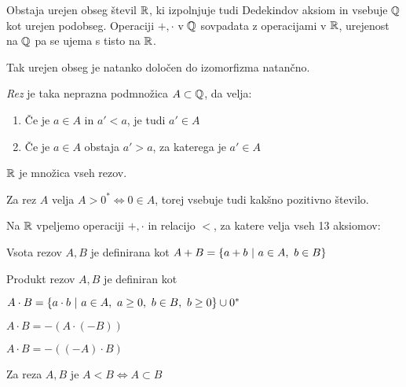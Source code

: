 \documentclass[12pt, a4paper]{article}
\begin{document}
\begin{izrek}
Obstaja urejen obseg števil $\mathbb{R}$, ki izpolnjuje tudi Dedekindov aksiom in vsebuje $\mathbb{Q}$ kot urejen podobseg. Operaciji $+,\cdot$ v $\mathbb{Q}$ sovpadata z operacijami v $\mathbb{R}$, urejenost na $\mathbb{Q}$ pa se ujema s tisto na $\mathbb{R}$.
\end{izrek}

\begin{opomba}
Tak urejen obseg je natanko določen do izomorfizma natančno.
\end{opomba}

\begin{definicija}
\emph{Rez} je taka neprazna podmnožica $A\subset\mathbb{Q}$, da velja:

\begin{enumerate}[label=\roman*)]
\item Če je $a\in A$ in $a'<a$, je tudi $a'\in A$
\item Če je $a\in A$ obstaja $a'>a$, za katerega je $a'\in A$
\end{enumerate}

$\mathbb{R}$ je množica vseh rezov.
\end{definicija}

\begin{opomba}
Za rez $A$ velja $A>0^*\iff 0\in A$, torej vsebuje tudi kakšno pozitivno število.
\end{opomba}

\begin{definicija}
Na $\mathbb{R}$ vpeljemo operaciji $+,\cdot$ in relacijo $<$, za katere velja vseh 13 aksiomov:

\begin{description}[font=\normalfont, align=left, labelwidth=3cm]
\item[$\bullet$ Operacija $+$] Vsota rezov $A,B$ je definirana kot $A+B=\left\{a+b~\middle\vert~a\in A,~b\in B\right\}$
\item[$\bullet$ Operacija $\cdot$] Produkt rezov $A,B$ je definiran kot

\begin{description}[font=\normalfont, align=left, labelwidth=3.5cm]
\item [i) $A,B>0$] $A\cdot B=\left\{a\cdot b~\middle\vert~a\in A,~a\geq 0,~b\in B,~b\geq 0\right\}\cup 0^*$
\item[ii) $A>0,B<0$] $A\cdot B=-(A\cdot(-B))$
\item [iii) $A<0$] $A\cdot B=-((-A)\cdot B)$
\end{description}
\item[$\bullet$ Relacija $<$] Za reza $A,B$ je $A<B\iff A\subset B$
\end{description}
\end{definicija}
\end{document}
